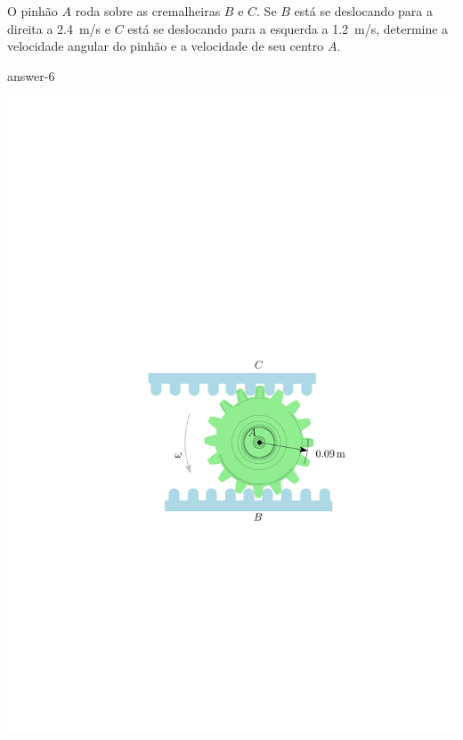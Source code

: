 \item O pinhão $A$ roda sobre as cremalheiras $B$ e $C$. Se $B$ está se deslocando para a direita a \SI{2.4}{\meter/\second} e $C$ está se deslocando para a esquerda a \SI{1.2}{\meter/\second}, determine a velocidade angular do pinhão e a velocidade de seu centro $A$.

{answer-6}

\vspace{-1.5cm}
\begin{flushright}
	\includegraphics[scale=.95]{images/draw_4}
\end{flushright}